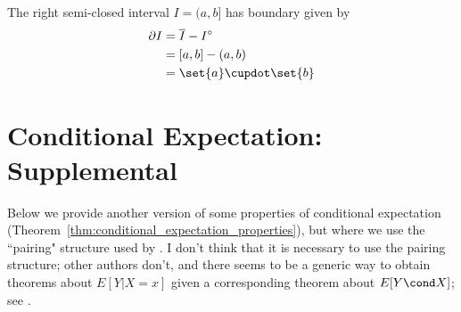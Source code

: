 \documentclass{article} %
\newcommand{\interior}[1]{{#1}^\circ}
\begin{document}
\begin{example}{} The right semi-closed interval $I=(a,b]$ has boundary given by
\begin{align*}
\partial I &= \overline{I} - \interior{I} \\
&= [a,b] - (a,b) \\
& = \set{a} \cupdot \set{b}
\end{align*}
%
\label{ex:boundary_of_rsc_interval}	
\end{example}

\section{Conditional Expectation: Supplemental}


Below we provide another version of some properties of conditional expectation (Theorem~\ref{thm:conditional_expectation_properties}), but where we use the ``pairing" structure used by \cite[Sec.~5.5]{ash2000probability}.  I don't think that it is necessary to use the pairing structure; other authors don't, and there seems to be a generic way to obtain theorems about $E[Y | X=x]$ given a corresponding theorem about $E[Y \cond X]$; see \cite[Sec.~5.5, Problem 3]{ash2000probability}.
\end{document}
